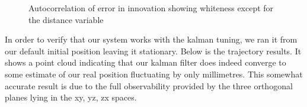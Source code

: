 \documentclass[]{article}
\begin{document}
{\begin{figure}[H]
	\centering     %
	\;
	\;
	\;
	\;
	\caption{Autocorrelation of error in innovation showing whiteness except for the distance variable}
	\label{fig:errorfigures}
\end{figure}


In order to verify that our system works with the kalman tuning, we ran it from our default initial position leaving it stationary. Below is the trajectory results. It shows a point cloud indicating that our kalman filter does indeed converge to some estimate of our real position fluctuating by only millimetres. This somewhat accurate result is due to the full observability provided by the three orthogonal planes lying in the xy, yz, zx spaces.


}
\end{document}

